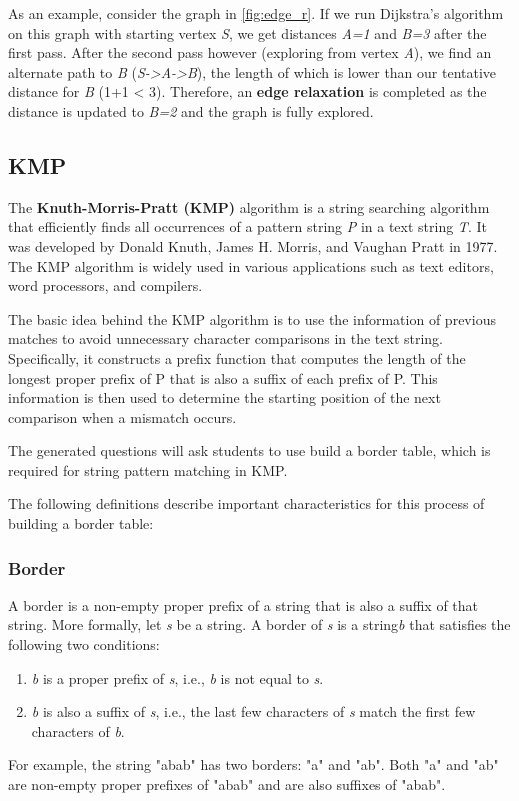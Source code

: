 \documentclass{l4proj}
\begin{document}
As an example, consider the graph in \autoref{fig:edge_r}. If we run Dijkstra's algorithm on this graph with starting vertex \emph{S}, we get distances \emph{A=1} and \emph{B=3} after the first pass. After the second pass however (exploring from vertex \emph{A}), we find an alternate path to \emph{B} (\emph{S->A->B}), the length of which is lower than our tentative distance for \emph{B} (1+1 < 3). Therefore, an \textbf{edge relaxation} is completed as the distance is updated to \emph{B=2} and the graph is fully explored.

\subsection{KMP}
\cite{a}
The \textbf{Knuth-Morris-Pratt (KMP)} algorithm is a string searching algorithm that efficiently finds all occurrences of a pattern string \emph{P} in a text string \emph{T}. It was developed by Donald Knuth, James H. Morris, and Vaughan Pratt in 1977. The KMP algorithm is widely used in various applications such as text editors, word processors, and compilers.

The basic idea behind the KMP algorithm is to use the information of previous matches to avoid unnecessary character comparisons in the text string. Specifically, it constructs a prefix function that computes the length of the longest proper prefix of P that is also a suffix of each prefix of P. This information is then used to determine the starting position of the next comparison when a mismatch occurs.

The generated questions will ask students to use build a border table, which is required for string pattern matching in KMP.

The following definitions describe important characteristics for this process of building a border table:
\subsubsection{Border}

A border is a non-empty proper prefix of a string that is also a suffix of that string. More formally, let \emph{s} be a string. A border of \emph{s} is a string\emph{b} that satisfies the following two conditions:
\begin{enumerate}
	\item
	\emph{b} is a proper prefix of \emph{s}, i.e., \emph{b} is not equal to \emph{s}.
	\item
	\emph{b} is also a suffix of \emph{s}, i.e., the last few characters of \emph{s} match the first few characters of \emph{b}.
\end{enumerate}
For example, the string "abab" has two borders: "a" and "ab". Both "a" and "ab" are non-empty proper prefixes of "abab" and are also suffixes of "abab".
\end{document}
